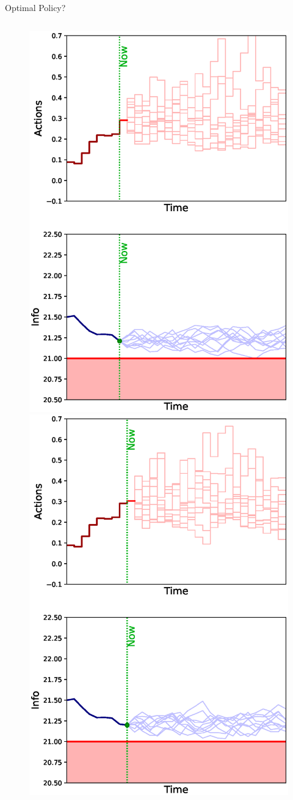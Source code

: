 \documentclass[lecture]{beamer}
\begin{document}
\begin{frame}{\normalsize Optimal Policy?}
\begin{columns}[t]
{\begin{overlayarea}{\textwidth}{0.8\textheight}
\begin{figure}
{        }%
        {%
          \includegraphics[width=.8\textwidth]{Codes/Basics/Policy7.eps}%
        }%
        {%
          \includegraphics[width=.8\textwidth]{Codes/Basics/Policy8.eps}%
}
\end{figure}
\end{overlayarea}}
\end{columns}
\end{frame}
\end{document}
